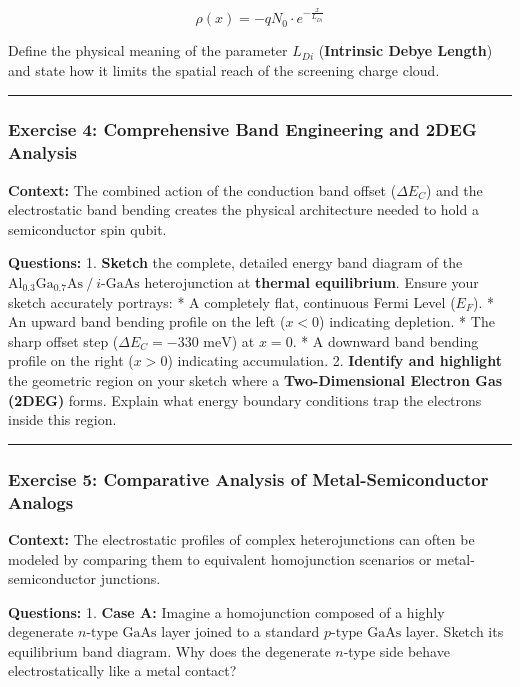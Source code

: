 \documentclass[
]{article}
\begin{document}
\[\rho(x) = -qN_0 \cdot e^{-\frac{x}{L_{Di}}}\]

Define the physical meaning of the parameter \(L_{Di}\)
(\textbf{Intrinsic Debye Length}) and state how it limits the spatial
reach of the screening charge cloud.

\begin{center}\rule{0.5\linewidth}{0.5pt}\end{center}

\subsubsection{Exercise 4: Comprehensive Band Engineering and 2DEG
Analysis}\label{exercise-4-comprehensive-band-engineering-and-2deg-analysis}

\textbf{Context:} The combined action of the conduction band offset
(\(\Delta E_C\)) and the electrostatic band bending creates the physical
architecture needed to hold a semiconductor spin qubit.

\textbf{Questions:} 1. \textbf{Sketch} the complete, detailed energy
band diagram of the
\(\text{Al}_{0.3}\text{Ga}_{0.7}\text{As} \ /\  i\text{-GaAs}\)
heterojunction at \textbf{thermal equilibrium}. Ensure your sketch
accurately portrays: * A completely flat, continuous Fermi Level
(\(E_F\)). * An upward band bending profile on the left (\(x < 0\))
indicating depletion. * The sharp offset step
(\(\Delta E_C = -330\text{ meV}\)) at \(x = 0\). * A downward band
bending profile on the right (\(x > 0\)) indicating accumulation. 2.
\textbf{Identify and highlight} the geometric region on your sketch
where a \textbf{Two-Dimensional Electron Gas (2DEG)} forms. Explain what
energy boundary conditions trap the electrons inside this region.

\begin{center}\rule{0.5\linewidth}{0.5pt}\end{center}

\subsubsection{Exercise 5: Comparative Analysis of Metal-Semiconductor
Analogs}\label{exercise-5-comparative-analysis-of-metal-semiconductor-analogs}

\textbf{Context:} The electrostatic profiles of complex heterojunctions
can often be modeled by comparing them to equivalent homojunction
scenarios or metal-semiconductor junctions.

\textbf{Questions:} 1. \textbf{Case A:} Imagine a homojunction composed
of a highly degenerate \(n\text{-type GaAs}\) layer joined to a standard
\(p\text{-type GaAs}\) layer. Sketch its equilibrium band diagram. Why
does the degenerate \(n\)-type side behave electrostatically like a
metal contact?
\end{document}
